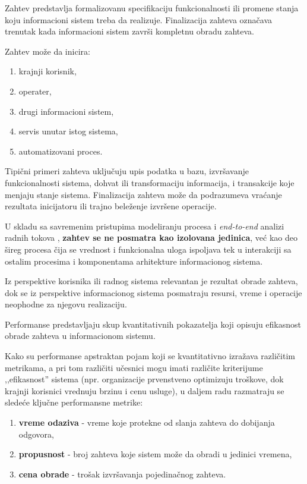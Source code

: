 \begin{definicija}\label{def:zahtev}
Zahtev predstavlja formalizovanu specifikaciju funkcionalnosti ili promene stanja koju informacioni sistem treba da realizuje. Finalizacija zahteva označava trenutak kada informacioni sistem završi kompletnu obradu zahteva.
\end{definicija}

Zahtev može da inicira:
\begin{enumerate}
\item krajnji korisnik,
\item operater,
\item drugi informacioni sistem,
\item servis unutar istog sistema,
\item automatizovani proces.
\end{enumerate}

Tipični primeri zahteva uključuju upis podatka u bazu, izvršavanje funkcionalnosti sistema, dohvat ili transformaciju informacija, i transakcije koje menjaju stanje sistema. Finalizacija zahteva može da podrazumeva vraćanje rezultata inicijatoru ili trajno beleženje izvršene operacije.

U skladu sa savremenim pristupima modeliranju procesa i \textit{end-to-end} analizi radnih tokova \cite{sedova2023development}, \textbf{zahtev se ne posmatra kao izolovana jedinica}, već kao deo šireg procesa čija se vrednost i funkcionalna uloga ispoljava tek u interakciji sa ostalim procesima i komponentama arhitekture informacionog sistema.

Iz perspektive korisnika ili radnog sistema relevantan je rezultat obrade zahteva, dok se iz perspektive informacionog sistema posmatraju resursi, vreme i operacije neophodne za njegovu realizaciju.

\begin{definicija}
Performanse predstavljaju skup kvantitativnih pokazatelja koji opisuju efikasnost obrade zahteva u informacionom sistemu.
\end{definicija}

Kako su performanse apstraktan pojam koji se kvantitativno izražava različitim metrikama, a pri tom različiti učesnici mogu imati različite kriterijume ,,efikasnost'' sistema (npr. organizacije prvenstveno optimizuju troškove, dok krajnji korisnici vrednuju brzinu i cenu usluge), u daljem radu razmatraju se sledeće ključne performansne metrike:
\begin{enumerate}
\item \textbf{vreme odaziva } - vreme koje protekne od slanja zahteva do dobijanja odgovora,
\item \textbf{propusnost } - broj zahteva koje sistem može da obradi u jedinici vremena,
\item \textbf{cena obrade } - trošak izvršavanja pojedinačnog zahteva.
\end{enumerate}

